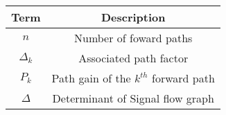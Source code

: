  \begin{tabular}{|c|c|}
    \hline
    \textbf{Term} & \textbf{Description}\\
    \hline
    $n$ & Number of foward paths\\
    \hline
    $\Delta{_k}$ & Associated path factor\\
    \hline
    $P_k$ & Path gain of the $k^{th}$ forward path\\
    \hline
    $\Delta$ & Determinant of Signal flow graph\\
    \hline
  \end{tabular}
